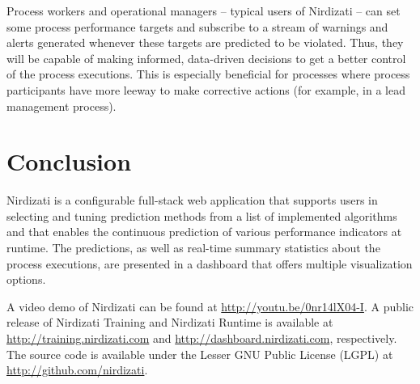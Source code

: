 \documentclass[runningheads,a4paper]{llncs}
\begin{document}
Process workers and operational managers -- typical users of Nirdizati -- can set some process performance targets and subscribe to a stream of warnings and alerts generated whenever these targets are predicted to be violated. Thus, they will be capable of making informed, data-driven decisions to get a better control of the process executions. This is especially beneficial for processes where process participants have more leeway to make corrective actions (for example, in a lead management process).

\section{Conclusion} \label{sec:conclusion}
Nirdizati is a configurable full-stack web application that supports users in selecting and tuning prediction methods from a list of implemented algorithms and that enables the continuous prediction of various performance indicators at runtime.
The predictions, as well as real-time summary statistics about the process executions, are presented in a dashboard that offers multiple visualization options.

A video demo of Nirdizati can be found at \url{http://youtu.be/0nr14lX04-I}. A public release of Nirdizati Training and Nirdizati Runtime is available at \url{http://training.nirdizati.com} and \url{http://dashboard.nirdizati.com}, respectively. The source code is available under the Lesser GNU Public License (LGPL) at \url{http://github.com/nirdizati}.


\end{document}
